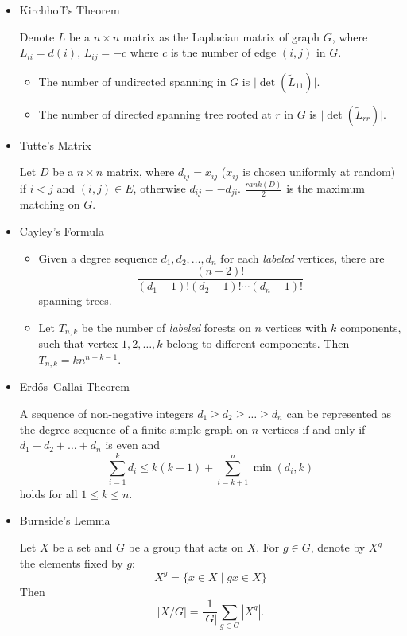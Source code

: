 
\begin{itemize}
\item Kirchhoff's Theorem

Denote $L$ be a $n \times n$ matrix as the Laplacian matrix of graph $G$, where $L_{ii} = d(i)$, $L_{ij} = -c$ where $c$ is the number of edge $(i, j)$ in $G$.
\begin{itemize}
    \item The number of undirected spanning in $G$ is $\lvert \det(\tilde{L}_{11}) \rvert$.
    \item The number of directed spanning tree rooted at $r$ in $G$ is $\lvert \det(\tilde{L}_{rr}) \rvert$.
\end{itemize}

\item Tutte's Matrix

Let $D$ be a $n \times n$ matrix, where $d_{ij} = x_{ij}$ ($x_{ij}$ is chosen uniformly at random) if $i < j$ and $(i, j) \in E$, otherwise $d_{ij} = -d_{ji}$. $\frac{rank(D)}{2}$ is the maximum matching on $G$.

\item Cayley's Formula

\begin{itemize}
  \item Given a degree sequence $d_1, d_2, \ldots, d_n$ for each \textit{labeled} vertices, there are $$\frac{(n - 2)!}{(d_1 - 1)!(d_2 - 1)!\cdots(d_n - 1)!}$$ spanning trees.
  \item Let $T_{n, k}$ be the number of \textit{labeled} forests on $n$ vertices with $k$ components, such that vertex $1, 2, \ldots, k$ belong to different components. Then $T_{n, k} = kn^{n - k - 1}$.
\end{itemize}

\item Erdős–Gallai Theorem

A sequence of non-negative integers $d_1 \geq d_2 \geq \ldots \geq d_n$ can be represented as the degree sequence of a finite simple graph on $n$ vertices if and only if $d_1 + d_2 + \ldots + d_n$ is even and
$$ \sum_{i = 1}^{k}d_i \leq k(k - 1) + \sum_{i = k + 1}^{n}\min(d_i, k) $$
holds for all $1 \leq k \leq n$.

\item Burnside's Lemma

Let $X$ be a set and $G$ be a group that acts on $X$.
For $g \in G$, denote by $X^g$ the elements fixed by $g$:
\[
X^g = \{ x \in X \mid gx \in X \}
\]
Then
\[
|X/G| = \frac{1}{|G|} \sum_{g \in G} |X^g|.
\]


\end{itemize}
